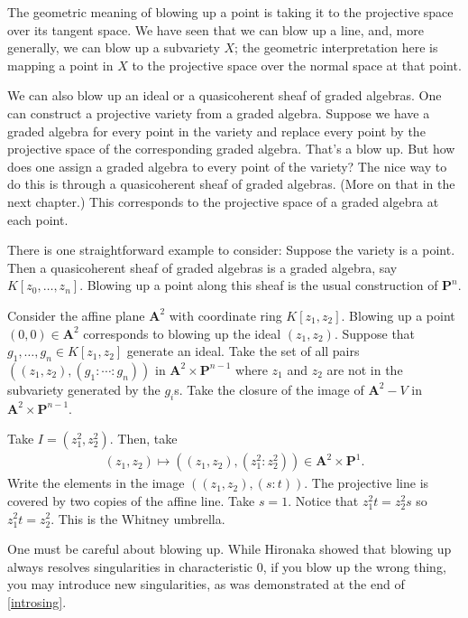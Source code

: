 \documentclass [11 pt, oneside] {article}
\begin{document}
The geometric meaning of blowing up a point is taking it to the projective space over its tangent space. We have seen that we can blow up a line, and, more generally, we can blow up a subvariety $X$; the geometric interpretation here is mapping a point in $X$ to the projective space over the normal space at that point. 

We can also blow up an ideal or a quasicoherent sheaf of graded algebras. One can construct a projective variety from a graded algebra. Suppose we have a graded algebra for every point in the variety and replace every point by the projective space of the corresponding graded algebra. That's a blow up. But how does one assign a graded algebra to every point of the variety? The nice way to do this is through a quasicoherent sheaf of graded algebras. (More on that in the next chapter.) This corresponds to the projective space of a graded algebra at each point.

There is one straightforward example to consider: Suppose the variety is a point. Then a quasicoherent sheaf of graded algebras is a graded algebra, say $K[z_0,\hdots,z_n]$. Blowing up a point along this sheaf is the usual construction of $\mathbf{P}^n$.

\begin{example}[ ]\label{introsing}\text{}
Consider the affine plane $\mathbf{A}^2$ with coordinate ring $K[z_1,z_2]$. Blowing up a point $(0,0)\in  \mathbf{A}^2$ corresponds to blowing up the ideal $(z_1,z_2)$. Suppose that $g_1,\hdots, g_n\in K[z_1,z_2]$ generate an ideal. Take the set of all pairs $((z_1,z_2), (g_1:\cdots:g_n))$ in $\mathbf{A}^2\times \mathbf{P}^{n-1}$ where $z_1$ and $z_2$ are not in the subvariety generated by the $g_i$s. Take the closure of the image of $\mathbf{A}^2- V$ in $\mathbf{A}^2\times \mathbf{P}^{n-1}$.

Take $I=(z_1^2,z_2^2)$. Then, take 
\begin{align*}
	(z_1,z_2)\longmapsto  ((z_1,z_2), (z_1^2:z_2^2)) \in \mathbf{A}^2\times \mathbf{P}^1.
\end{align*}
Write the elements in the image $((z_1,z_2),  (s:t))$. The projective line is covered by two copies of the affine line. Take $s=1$. Notice that $z_1^2t = z_2^2s$ so $z_1^2t=z_2^2$. This is the Whitney umbrella.
\end{example}

\begin{warn}
	One must be careful about blowing up. While Hironaka showed that blowing up always resolves singularities in characteristic $0$, if you blow up the wrong thing, you may introduce new singularities, as was demonstrated at the end of \cref{introsing}.
\end{warn}
\end{document}
